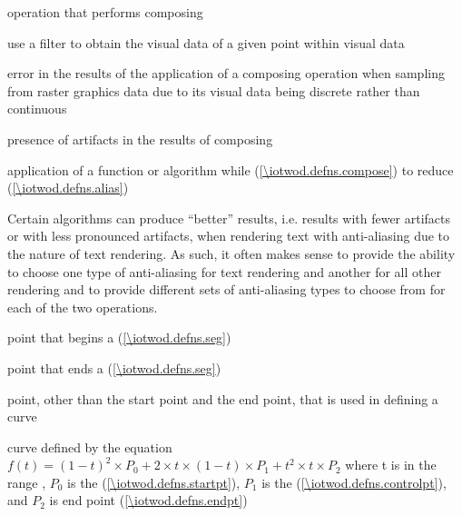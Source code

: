 %
operation that performs composing

%
use a filter to obtain the visual data of a given point within visual data

%
error in the results of the application of a composing operation when sampling from raster graphics data due to its visual data being discrete rather than continuous

%
presence of artifacts in the results of composing

%
application of a function or algorithm while  (\ref{\iotwod.defns.compose}) to reduce  (\ref{\iotwod.defns.alias})
\begin{note}
Certain algorithms can produce ``better'' results, i.e. results with fewer artifacts or with less pronounced artifacts, when rendering text with anti-aliasing due to the nature of text rendering. As such, it often makes sense to provide the ability to choose one type of anti-aliasing for text rendering and another for all other rendering and to provide different sets of anti-aliasing types to choose from for each of the two operations.
\end{note}

%
%

%
point that begins a  (\ref{\iotwod.defns.seg})

%
point that ends a  (\ref{\iotwod.defns.seg})

%
point, other than the start point and the end point, that is used in defining a curve

%
%
 curve defined by the 
equation $f(t) = (1 - t)^{2} \times P_{0} + 2 \times t \times (1 - t) 
\times P_{1} + t^{2} \times t \times P_{2}$ where t is in the range , $P_{0}$ is the  (\ref{\iotwod.defns.startpt}), $P_{1}$ is the  (\ref{\iotwod.defns.controlpt}), and $P_{2}$ is end point (\ref{\iotwod.defns.endpt})

